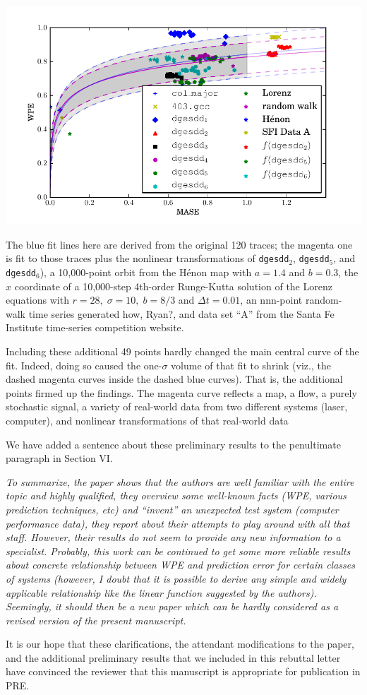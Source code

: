 \documentclass[12pt]{article}
\newcommand{\alert}[1]{{\color{red}#1}}
\begin{document}
\begin{center}
    \includegraphics[width=0.8\columnwidth]{figs/new_prediction_vs_entropy_extras_with_nonlinear_all_points}
\end{center}

The blue fit lines here are derived from the original 120 traces; the
magenta one is fit to those traces plus the nonlinear transformations
of {\tt dgesdd}$_2$, {\tt dgesdd}$_5$, and {\tt dgesdd}$_6$), a
10,000-point orbit from the H\'{e}non map with $a=1.4$ and $b=0.3$,
the $x$ coordinate of a 10,000-step 4th-order Runge-Kutta solution of
the Lorenz equations with $r=28, \; \sigma=10, \; b=8/3$ and $\Delta
t=0.01$, an \alert{nnn-point} random-walk time series generated
\alert{how, Ryan?}, and data set ``A'' from the Santa Fe Institute
time-series competition website.  

Including these additional 49 points hardly changed the main central
curve of the fit.  Indeed, doing so caused the one-$\sigma$ volume of
that fit to shrink (viz., the dashed magenta curves inside the dashed
blue curves).  That is, the additional points firmed up the findings.
The magenta curve reflects a map, a flow, a purely stochastic signal,
a variety of real-world data from two different systems (laser,
computer), and nonlinear transformations of that real-world data

We have added a sentence about these preliminary results to the
penultimate paragraph in Section VI.

\smallskip

\emph{To summarize, the paper shows that the authors are well familiar
  with the entire topic and highly qualified, they overview some
  well-known facts (WPE, various prediction techniques, etc) and
  ``invent'' an unexpected test system (computer performance data),
  they report about their attempts to play around with all that
  staff. However, their results do not seem to provide any new
  information to a specialist. Probably, this work can be continued to
  get some more reliable results about concrete relationship between
  WPE and prediction error for certain classes of systems (however, I
  doubt that it is possible to derive any simple and widely applicable
  relationship like the linear function suggested by the
  authors). Seemingly, it should then be a new paper which can be
  hardly considered as a revised version of the present manuscript.}

It is our hope that these clarifications, the attendant modifications
to the paper, and the additional preliminary results that we included
in this rebuttal letter have convinced the reviewer that this
manuscript is appropriate for publication in PRE.
\end{document}
